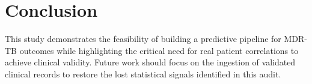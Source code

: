 \chapter{Conclusion}
This study demonstrates the feasibility of building a predictive pipeline for MDR-TB outcomes while highlighting the critical need for real patient correlations to achieve clinical validity. Future work should focus on the ingestion of validated clinical records to restore the lost statistical signals identified in this audit.

